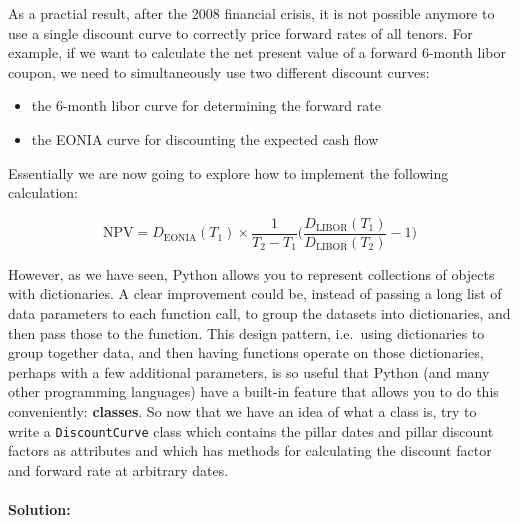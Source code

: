 As a practial result, after the 2008 financial crisis, it is not
possible anymore to use a single discount curve to correctly price
forward rates of all tenors. For example, if we want to calculate the
net present value of a forward 6-month libor coupon, we need to
simultaneously use two different discount curves:

\begin{itemize}
\tightlist
\item
  the 6-month libor curve for determining the forward rate
\item
  the EONIA curve for discounting the expected cash flow
\end{itemize}

Essentially we are now going to explore how to implement the following
calculation:

\[\mathrm{NPV} = D_{\mathrm{EONIA}}(T_1) \times \frac{1}{T_2-T_1}\Big(\frac{D_{\mathrm{LIBOR}}(T_1)}{D_{\mathrm{LIBOR}}(T_2)} - 1 \Big)\]


However, as we have seen, Python allows you to represent collections of
objects with dictionaries. A clear improvement could be, instead of
passing a long list of data parameters to each function call, to group
the datasets into dictionaries, and then pass those to the function.
    This design pattern, i.e.~using dictionaries to group together data, and
then having functions operate on those dictionaries, perhaps with a few
additional parameters, is so useful that Python (and many other
programming languages) have a built-in feature that allows you to do
this conveniently: \textbf{classes}.
So now that we have an idea of what a class is, try to write a
\texttt{DiscountCurve} class which contains the pillar dates and pillar
discount factors as attributes and which has methods for calculating the
discount factor and forward rate at arbitrary dates.

\hypertarget{solution}{%
\paragraph{Solution:}\label{solution}}

